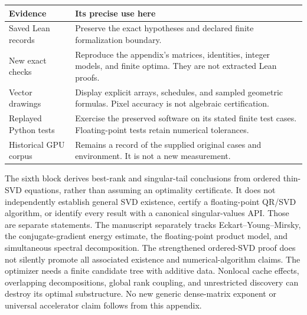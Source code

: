 \begin{tabularx}{\linewidth}{@{}p{.25\linewidth}Y@{}}\toprule
Evidence & Its precise use here \\\midrule
Saved Lean records & Preserve the exact hypotheses and declared finite formalization boundary.\\
New exact checks & Reproduce the appendix's matrices, identities, integer models, and finite optima. They are not extracted Lean proofs.\\
Vector drawings & Display explicit arrays, schedules, and sampled geometric formulas. Pixel accuracy is not algebraic certification.\\
Replayed Python tests & Exercise the preserved software on its stated finite test cases. Floating-point tests retain numerical tolerances.\\
Historical GPU corpus & Remains a record of the supplied original cases and environment. It is not a new measurement.\\\bottomrule
\end{tabularx}
The sixth block derives best-rank and singular-tail conclusions from ordered thin-SVD equations, rather than assuming an optimality certificate. It does not independently establish general SVD existence, certify a floating-point QR/SVD algorithm, or identify every result with a canonical singular-values API. Those are separate statements.
The manuscript separately tracks Eckart--Young--Mirsky, the conjugate-gradient energy estimate, the floating-point product model, and simultaneous spectral decomposition. The strengthened ordered-SVD proof does not silently promote all associated existence and numerical-algorithm claims.
The optimizer needs a finite candidate tree with additive data. Nonlocal cache effects, overlapping decompositions, global rank coupling, and unrestricted discovery can destroy its optimal substructure. No new generic dense-matrix exponent or universal accelerator claim follows from this appendix.
